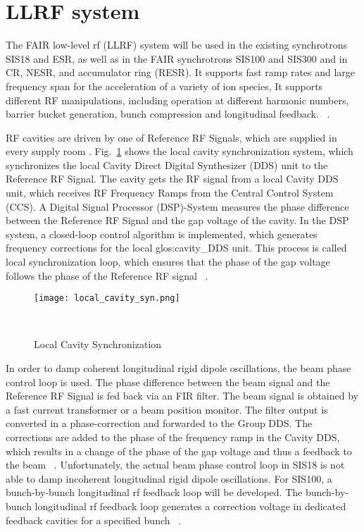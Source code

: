 \section{LLRF system}
The FAIR low-level rf (\gls{LLRF}) system will be used in the existing synchrotrons SIS18 and \gls{ESR}, as well as in the FAIR synchrotrons SIS100 and SIS300 and in \gls{CR}, \gls{NESR}, and accumulator ring (\gls{RESR}). It supports fast ramp rates and large frequency span for the acceleration of a variety of ion species, It supports different RF manipulations, including operation at different harmonic numbers, barrier bucket generation, bunch compression and longitudinal feedback. ~\cite{klingbeil_new_2011}. 

RF cavities are driven by one of Reference RF Signals, which are supplied in every supply room . Fig.~\ref{local_cavity_syn} shows the local cavity synchronization system, which synchronizes the local Cavity Direct Digital Synthesizer (DDS) unit to the Reference RF Signal. The cavity gets the RF signal from a local Cavity \gls{DDS} unit, which receives RF Frequency Ramps from the Central Control System (\gls{CCS}). A Digital Signal Processor (\gls{DSP})-System measures the phase difference between the Reference RF Signal and the gap voltage of the cavity. In the DSP system, a closed-loop control algorithm is implemented, which generates frequency corrections for the local \gls{glos:cavity_DDS} unit. This process is called local synchronization loop, which ensures that the phase of the gap voltage follows the phase of the Reference RF signal ~\cite{klingbeil_new_2011}. 
\begin{figure}[H]
   \centering   
   \texttt{[image: local\_cavity\_syn.png]}
   \caption{Local Cavity Synchronization}{~\cite{klingbeil_new_2011}}
   \label{local_cavity_syn}
\end{figure}

In order to damp coherent longitudinal rigid dipole oscillations, the beam phase control loop is used. The phase difference between the beam signal and the Reference RF Signal is fed back via an FIR filter. The beam signal is obtained by a fast current transformer or a beam position monitor. The filter output is converted in a phase-correction and forwarded to the Group DDS. The corrections are added to the phase of the  frequency ramp in the Cavity DDS, which results in a change of the phase of the gap voltage and thus a feedback to the beam ~\cite{baudrenghien_low-level_2010}. Unfortunately, the actual beam phase control loop in SIS18 is not able to damp incoherent longitudinal rigid dipole oscillations. For SIS100, a bunch-by-bunch longitudinal rf feedback loop will be developed. The bunch-by-bunch longitudinal rf feedback loop generates a correction voltage in dedicated feedback cavities for a specified bunch ~\cite{gross_bunch-by-bunch_2015}. 




